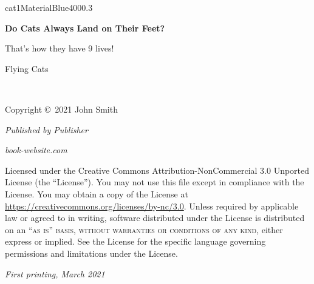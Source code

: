 \documentclass[a4paper,12pt]{book}
\begin{document}
    \begin{simplefrontpage}{cat1}{MaterialBlue400}{0.3}
        \par\normalfont\fontsize{35}{35}\sffamily\selectfont
        \textbf{Do Cats Always Land on Their Feet?}\par
        {\LARGE That's how they have 9 lives!}\par %
        \vspace*{1cm}
        {\Huge Flying Cats}\par %
    \end{simplefrontpage}
    \newpage
    \thispagestyle{empty}
    ~\vfill

    \noindent Copyright \copyright\ 2021 John Smith %

    \noindent \textsl{Published by Publisher} %

    \noindent \textit{book-website.com} %

    \noindent Licensed under the Creative Commons Attribution-NonCommercial 3.0 Unported License
    (the ``License'').
    You may not use this file except in compliance with the License.
    You may obtain a copy of the License at \url{https://creativecommons.org/licenses/by-nc/3.0}.
    Unless required by applicable law or agreed to in writing, software distributed under the
    License is distributed on an \textsc{``as is'' basis, without warranties or conditions of any
    kind}, either express or implied.
    See the License for the specific language governing permissions and limitations under the
    License. %

    \noindent \textit{First printing, March 2021} %

    \pagestyle{empty} %

    \tableofcontents %

    \let\cleardoublepage\clearpage  %

    \pagestyle{fancy} %

    
    \let\cleardoublepage\clearpage

    
    \let\cleardoublepage\clearpage
\end{document}
